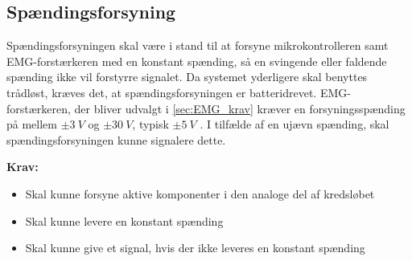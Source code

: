 \subsection{Spændingsforsyning} \label{sec:krav_spaending}
Spændingsforsyningen skal være i stand til at forsyne mikrokontrolleren samt EMG-forstærkeren med en konstant spænding, så en svingende eller faldende spænding ikke vil forstyrre signalet. Da systemet yderligere skal benyttes trådløst, kræves det, at spændingsforsyningen er batteridrevet. EMG-forstærkeren, der bliver udvalgt i \autoref{sec:EMG_krav} kræver en forsyningsspænding på mellem $\pm 3~V$ og $\pm 30~V$, typisk $\pm 5~V$ \citep{advancertech2013}.
I tilfælde af en ujævn spænding, skal spændingsforsyningen kunne signalere dette. 


\vspace{3mm}
\textbf{Krav:}
\begin{itemize} 
\item Skal kunne forsyne aktive komponenter i den analoge del af kredsløbet
\item Skal kunne levere en konstant spænding
\item Skal kunne give et signal, hvis der ikke leveres en konstant spænding 
\end{itemize}
